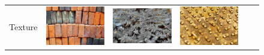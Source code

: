 \begin{figure}
\begin{tabular}{m{.01\linewidth} m{.16\linewidth} m{.16\linewidth} m{.16\linewidth} m{.16\linewidth} m{.16\linewidth}}
    \begin{turn}{90}{Texture}\end{turn} &
    \includegraphics[width=\linewidth]{../style/figures/flickr_on_flickr/pred_style_Texture/0.jpg} &
    \includegraphics[width=\linewidth]{../style/figures/flickr_on_flickr/pred_style_Texture/1.jpg} &
    \includegraphics[width=\linewidth]{../style/figures/flickr_on_flickr/pred_style_Texture/2.jpg} &

\end{tabular}
\end{figure}
